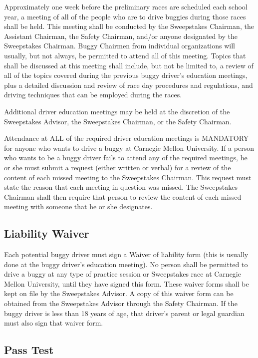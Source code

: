 	Approximately one week before the preliminary races are scheduled each school year, a meeting of all of the people who are to drive buggies during those races shall be held. This meeting shall be conducted by the Sweepstakes Chairman, the Assistant Chairman, the Safety Chairman, and/or anyone designated by the Sweepstakes Chairman. Buggy Chairmen from individual organizations will usually, but not always, be	permitted to attend all of this meeting. Topics that shall be discussed at this meeting shall include, but not be limited to, a review of all of the topics covered during the previous buggy driver's education meetings, plus a detailed discussion and review of race day procedures and regulations, and driving techniques that can be employed during the races.
	
	Additional driver education meetings may be held at the discretion of the Sweepstakes Advisor, the Sweepstakes Chairman, or the Safety Chairman.
	
	Attendance at ALL of the required driver education meetings is MANDATORY for anyone who wants to drive a buggy at Carnegie Mellon University. If a person who wants to be a buggy driver fails to attend any of the required meetings, he or she must submit a request (either written or verbal) for a review of the content of each missed meeting to the Sweepstakes Chairman. This request must state the reason that each meeting in question was missed. The Sweepstakes Chairman shall then require that person to review the content of each missed meeting with someone that he or she designates.

\subsection{Liability Waiver}

	Each potential buggy driver must sign a Waiver of liability form (this is usually done at the buggy driver's education meeting). No person shall be permitted to drive a buggy at any type of practice session or Sweepstakes race at Carnegie Mellon University, until they have signed this form. These waiver forms shall be kept on file by the Sweepstakes Advisor. A copy of this waiver form can be obtained from the Sweepstakes Advisor through the Safety Chairman. If the buggy driver is less than 18 years of age, that driver's parent or legal guardian must also sign that waiver form.

\subsection{Pass Test}

